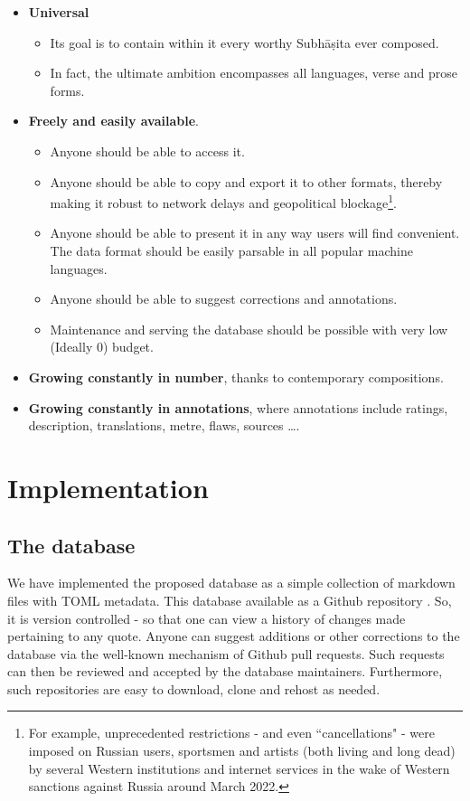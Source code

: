 \documentclass[11pt]{article}
\begin{document}
\begin{itemize}
\tightlist
\item
  \textbf{Universal}

  \begin{itemize}
  \tightlist
  \item
    Its goal is to contain within it every worthy Subhāṣita ever
    composed.
  \item
    In fact, the ultimate ambition encompasses all languages, verse
    and prose forms.
  \end{itemize}

\item
  \textbf{Freely and easily available}.

  \begin{itemize}
  \tightlist
  \item
     Anyone should be able to access it.
  \item
     Anyone should be able to copy and export it to other formats, thereby making it robust to network delays and geopolitical blockage\footnote{For example, unprecedented restrictions - and even ``cancellations" - were imposed on Russian users, sportsmen and artists (both living and long dead) by several Western institutions and internet services in the wake of Western sanctions against Russia around March 2022.}. 
  \item
     Anyone should be able to present it in any way users will find convenient. The data format should be easily parsable in all popular machine languages.
  \item
     Anyone should be able to suggest corrections and annotations. 
  \item
     Maintenance and serving the database should be possible with very low (Ideally 0) budget. 
  \end{itemize}
\item
  \textbf{Growing constantly in number}, thanks to contemporary compositions.
\item
  \textbf{Growing constantly in annotations}, where annotations include ratings, description, translations, metre, flaws, sources \ldots.
\end{itemize}

\section{Implementation}
\subsection{The database}
We have implemented the proposed database as a simple collection of markdown files with TOML metadata. This database available as a Github repository \cite{subhaashita_db_sa_padya}. So, it is version controlled - so that one can view a history of changes made pertaining to any quote. Anyone can suggest additions or other corrections to the database via the well-known mechanism of Github pull requests. Such requests can then be reviewed and accepted by the database maintainers. Furthermore, such repositories are easy to download, clone and rehost as needed. 
\end{document}
